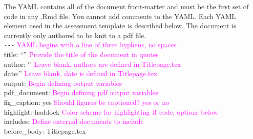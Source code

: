 \documentclass[12pt,]{article}
\begin{document}
The YAML contains all of the document front-matter and must be the first
set of code in any .Rmd file. You cannot add comments to the YAML. Each
YAML element used in the assessment template is described below. The
document is currently only authored to be knit to a pdf file.\\
\texttt{-\/-\/-}
\textcolor{magenta}{YAML begins with a line of three hyphens, no spaces}\\
title: ``''
\textcolor{magenta}{Provide the title of the document in quotes}\\
author: `'
\textcolor{magenta}{Leave blank, authors are defined in Titlepage.tex}\\
date:''
\textcolor{magenta}{Leave blank, date is defined in Titlepage.tex}\\
output: \textcolor{magenta}{Begin defining output variables}\\
\hspace*{0.333em}\hspace*{0.333em} pdf\_document:
\textcolor{magenta}{Begin defining pdf output variables}\\
\hspace*{0.333em}\hspace*{0.333em}\hspace*{0.333em}\hspace*{0.333em}
fig\_caption: yes
\textcolor{magenta}{Should figures be captioned? yes or no}\\
\hspace*{0.333em}\hspace*{0.333em}\hspace*{0.333em}\hspace*{0.333em}
highlight: haddock
\textcolor{magenta}{Color scheme for highlighting R code; options below}\\
\hspace*{0.333em}\hspace*{0.333em}\hspace*{0.333em}\hspace*{0.333em}
includes: \textcolor{magenta}{Define external documents to include}\\
\hspace*{0.333em}\hspace*{0.333em}\hspace*{0.333em}\hspace*{0.333em}\hspace*{0.333em}\hspace*{0.333em}\hspace*{0.333em}
before\_body: Titlepage.tex
\end{document}
